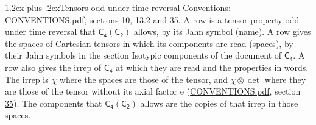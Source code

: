 \documentclass[10pt,a4paper]{article}
\makeatletter
\renewcommand\section{\@startsection{section}{1}{\z@}{-3ex plus -1ex minus -.2ex}%
  {1.2ex plus .2ex}{\normalfont\large\sffamily\bfseries\color{parttitle}}}
\numberwithin{equation}{section}
\newcommand{\grp}[1]{\mathsf{#1}}
\newcommand{\irrprod}{\otimes}
\makeatother
\begin{document}
\section{Tensors odd under time reversal}\label{s:time_odd}
Conventions: \href{../../CONVENTIONS.pdf}{CONVENTIONS.pdf}, sections \href{../../../rotation/CONVENTIONS.pdf\#conv.10}{10}, \href{../../../rotation/CONVENTIONS.pdf\#conv.13.2}{13.2} and \href{../../CONVENTIONS.pdf\#conv.35}{35}.
\leavevmode\label{n:head.name.property}A row is a tensor property odd under time reversal that $\grp{C_{4}}(\grp{C_{2}})$ allows, by its Jahn symbol (name). \label{n:head.spaces}A row gives the spaces of Cartesian tensors in which its components are read (spaces), by their Jahn symbols in the section Isotypic components of the document of \href{../../../rotation/data/pdf/C4.pdf}{$\grp{C_{4}}$}. \label{n:head.properties}A row also gives the irrep of $\grp{C_{4}}$ at which they are read and the properties in words. The irrep is $\chi$ where the spaces are those of the tensor, and $\chi \irrprod \det$ where they are those of the tensor without its axial factor e (\href{../../CONVENTIONS.pdf}{CONVENTIONS.pdf}, section \href{../../CONVENTIONS.pdf\#conv.35}{35}). The components that $\grp{C_{4}}(\grp{C_{2}})$ allows are the copies of that irrep in those spaces.
\end{document}
